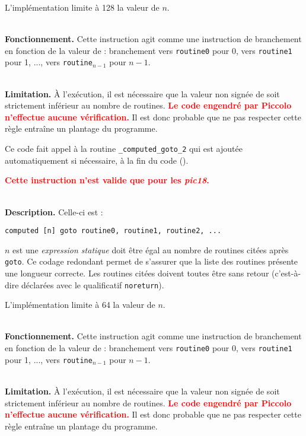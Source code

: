 L'implémentation limite à 128 la valeur de $n$.

~\\
\textbf{Fonctionnement.} Cette instruction agit comme une instruction de branchement en fonction de la valeur de  : branchement vers \texttt{routine0} pour 0, vers \texttt{routine1} pour 1, ..., vers \texttt{routine$_{n-1}$} pour $n-1$. 

~\\
\textbf{Limitation.} À l'exécution, il est nécessaire que la valeur non signée de  soit strictement inférieur au nombre de routines. \textcolor{red}{\bf Le code engendré par Piccolo n'effectue aucune vérification.} Il est donc probable que ne pas respecter cette règle entraîne un plantage du programme.

Ce code fait appel à la routine \texttt{\_computed\_goto\_2} qui est ajoutée automatiquement si nécessaire, à la fin du code (). 




\textcolor{red}{\bf Cette instruction n'est valide que pour les \emph{pic18}.}

~\\
\textbf{Description.} Celle-ci est :
\begin{lstlisting}[language=piccolo]
computed [n] goto routine0, routine1, routine2, ...
\end{lstlisting}

$n$ est une \emph{expression statique} doit être égal au nombre de routines citées après \texttt{goto}. Ce codage redondant permet de s'assurer que la liste des routines présente une longueur correcte. Les routines citées doivent toutes être sans retour (c'est-à-dire déclarées avec le qualificatif \texttt{noreturn}).

L'implémentation limite à 64 la valeur de $n$.

~\\
\textbf{Fonctionnement.} Cette instruction agit comme une instruction de branchement en fonction de la valeur de  : branchement vers \texttt{routine0} pour 0, vers \texttt{routine1} pour 1, ..., vers \texttt{routine$_{n-1}$} pour $n-1$. 

~\\
\textbf{Limitation.} À l'exécution, il est nécessaire que la valeur non signée de  soit strictement inférieur au nombre de routines. \textcolor{red}{\bf Le code engendré par Piccolo n'effectue aucune vérification.} Il est donc probable que ne pas respecter cette règle entraîne un plantage du programme.


